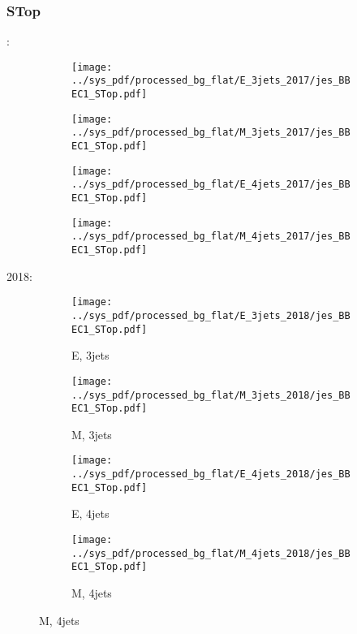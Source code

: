 \documentclass{beamer}
\begin{document}
\begin{frame}
\frametitle{STop}
\fontsize{5}{1}:
\begin{figure}
\centering
\begin{subfigure}[b]{0.24\textwidth}
\texttt{[image: ../sys\_pdf/processed\_bg\_flat/E\_3jets\_2017/jes\_BBEC1\_STop.pdf]}
\end{subfigure}
\begin{subfigure}[b]{0.24\textwidth}
\texttt{[image: ../sys\_pdf/processed\_bg\_flat/M\_3jets\_2017/jes\_BBEC1\_STop.pdf]}
\end{subfigure}
\begin{subfigure}[b]{0.24\textwidth}
\texttt{[image: ../sys\_pdf/processed\_bg\_flat/E\_4jets\_2017/jes\_BBEC1\_STop.pdf]}
\end{subfigure}
\begin{subfigure}[b]{0.24\textwidth}
\texttt{[image: ../sys\_pdf/processed\_bg\_flat/M\_4jets\_2017/jes\_BBEC1\_STop.pdf]}
\end{subfigure}
\end{figure}
2018:
\begin{figure}
\centering
\begin{subfigure}[b]{0.24\textwidth}
\texttt{[image: ../sys\_pdf/processed\_bg\_flat/E\_3jets\_2018/jes\_BBEC1\_STop.pdf]}
\captionsetup{font=tiny}
\caption{E, 3jets}
\end{subfigure}
\begin{subfigure}[b]{0.24\textwidth}
\texttt{[image: ../sys\_pdf/processed\_bg\_flat/M\_3jets\_2018/jes\_BBEC1\_STop.pdf]}
\captionsetup{font=tiny}
\caption{M, 3jets}
\end{subfigure}
\begin{subfigure}[b]{0.24\textwidth}
\texttt{[image: ../sys\_pdf/processed\_bg\_flat/E\_4jets\_2018/jes\_BBEC1\_STop.pdf]}
\captionsetup{font=tiny}
\caption{E, 4jets}
\end{subfigure}
\begin{subfigure}[b]{0.24\textwidth}
\texttt{[image: ../sys\_pdf/processed\_bg\_flat/M\_4jets\_2018/jes\_BBEC1\_STop.pdf]}
\captionsetup{font=tiny}
\caption{M, 4jets}
\end{subfigure}
\end{figure}
\end{frame}
\end{document}

